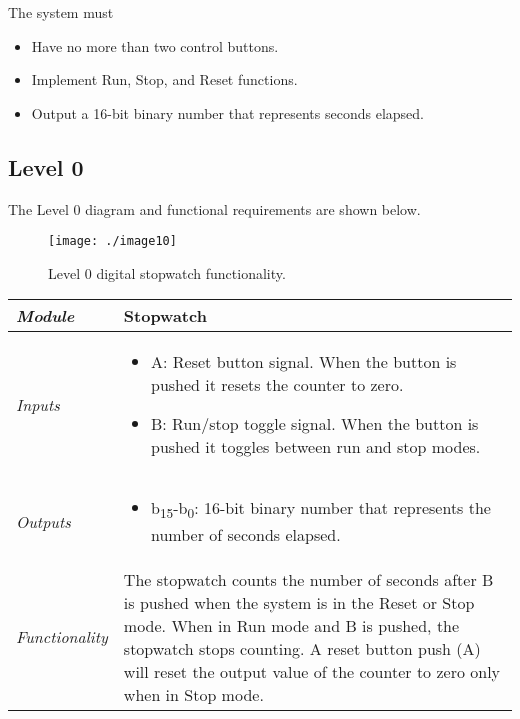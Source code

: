 The system must

\begin{itemize}
\item
  Have no more than two control buttons.
\item
  Implement Run, Stop, and Reset functions.
\item
  Output a 16-bit binary number that represents seconds elapsed.
\end{itemize}

\subsection*{Level 0}
\label{subsection:level-0-1}


The Level 0 diagram and functional requirements are shown below.

\begin{figure}
\texttt{[image: ./image10]}
\caption{Level 0 digital stopwatch functionality.}
\label{figure:conceptFan}
\end{figure}



\begin{table}
\label{table:level1HighGainAmp}
\begin{tabular}{|l|m{10cm}|}
\hline
\emph{Module} & Stopwatch \\ \hline
\emph{Inputs} & 
\begin{itemize}
\item
  A: Reset button signal. When the button is pushed it resets the
  counter to zero.
\item
  B: Run/stop toggle signal. When the button is pushed it toggles
  between run and stop modes.
\end{itemize}\\ \hline

\emph{Outputs} & 
\begin{itemize}
\item
  b\textsubscript{15}-b\textsubscript{0}: 16-bit binary number that
  represents the number of seconds elapsed.
\end{itemize} \\ \hline
\emph{Functionality} & The stopwatch counts the number of seconds after
B is pushed when the system is in the Reset or Stop mode. When in Run
mode and B is pushed, the stopwatch stops counting. A reset button push
(A) will reset the output value of the counter to zero only when in Stop
mode. \\ \hline
\end{tabular}
\end{table}

